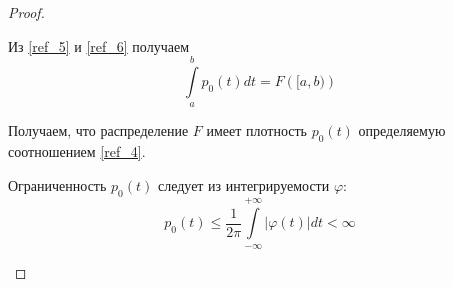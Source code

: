 \documentclass[a4paper,12pt]{article}
\newcommand{\lt}{\left}
\newcommand{\rt}{\right}
\newcommand{\fr}{\frac}
\newcommand{\vp}{\varphi}
\begin{document}
\begin{enumerate}
\begin{proof}
\begin{enumerate}
	Из \eqref{ref_5} и \eqref{ref_6} получаем
	\begin{equation}\label{ref_7}
		\int\limits_{a}^{b} p_{0}(t)dt = F\lt([a, b)\rt)
	\end{equation}
	
	Получаем, что распределение $F$ имеет плотность $p_0(t)$ определяемую соотношением \eqref{ref_4}.
	
	Ограниченность $p_0(t)$ следует из интегрируемости $\vp$:
	\begin{equation}
	p_0(t) \le \fr{1}{2\pi}\int\limits_{-\infty}^{+\infty}|\vp(t)|dt < \infty
	\end{equation}
	
\end{enumerate}
	
\end{proof}	

\end{enumerate}	



\section{}
\end{document}
